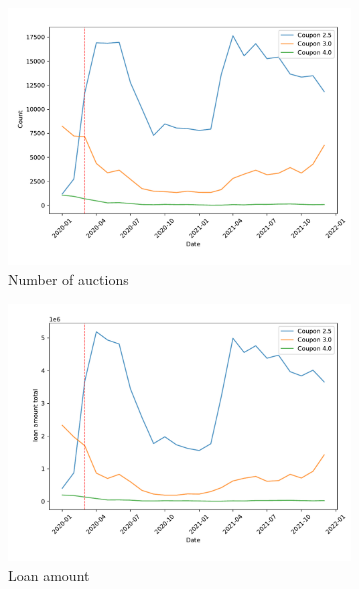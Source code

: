 \documentclass[11pt,a4paper]{article}
\begin{document}
\begin{figure}[h]
  \centering
  \begin{subfigure}[b]{0.49\textwidth}
      \includegraphics[width=0.998\textwidth]{../results/figures/winner_bid_count_mat30_loan1_timeseries_cpmonthly_2.5_4_.pdf}
      \caption{ Number of auctions}
     \end{subfigure}
     \begin{subfigure}[b]{0.49\textwidth}
      \includegraphics[width=0.998\textwidth]{../results/figures/LoanAmount_sum_mat30_loan1_timeseries_cpmonthly_2.5_4_.pdf}
      \caption{Loan amount}
     \end{subfigure}
     \begin{subfigure}[b]{0.49\textwidth}

\end{subfigure}
\end{figure}
\end{document}
